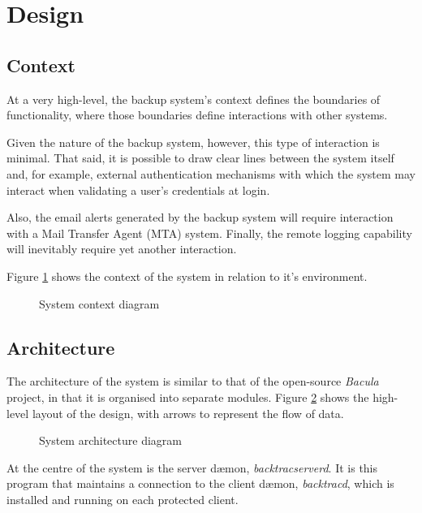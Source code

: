 \section{Design}

\subsection{Context}

At a very high-level, the backup system's context defines the boundaries of
functionality, where those boundaries define interactions with other systems.

Given the nature of the backup system, however, this type of interaction is
minimal. That said, it is possible to draw clear lines between the system
itself and, for example, external authentication mechanisms with which the
system may interact when validating a user's credentials at login.

Also, the email alerts generated by the backup system will require interaction
with a Mail Transfer Agent (MTA) system. Finally, the remote logging capability
will inevitably require yet another interaction.

Figure \ref{fig:context} shows the context of the system in relation to it's
environment.

\begin{figure}[h]
    \begin{center}
        
    \end{center}
    \caption{System context diagram}
    \label{fig:context}
\end{figure}

\subsection{Architecture}

The architecture of the system is similar to that of the open-source
\emph{Bacula} project, in that it is organised into separate modules. Figure
\ref{fig:architecture} shows the high-level layout of the design, with arrows
to represent the flow of data.

\begin{figure}[h]
    \begin{center}
        
    \end{center}
    \caption{System architecture diagram}
    \label{fig:architecture}
\end{figure}

At the centre of the system is the server d{\ae}mon, \emph{backtracserverd}.
It is this program that maintains a connection to the client d{\ae}mon,
\emph{backtracd}, which is installed and running on each protected client.

